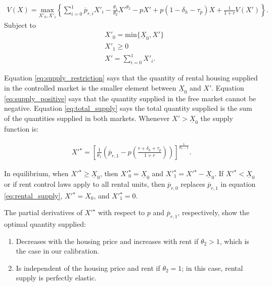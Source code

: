 \documentclass[parskip=full]{article}
\begin{document}
\begin{align}\label{eq:rental_company_problem}
V(X)=\underset{X'_{0},X'_{1}} {\text{$\mbox{max} $}}\left\{\sum_{i=0}^{1} \overline{p}_{r,i}X'_{i}-\frac{\theta_{1}}{\theta_{2}}X'^{\theta_{2}}-p X'+p(1-\delta_{h}-\tau_{p})X+\frac{1}{1+r}V(X')\right\}.
\end{align}
Subject to
\begin{align}
& X'_{0}=\mbox{min}\{\underline{X}_{0},X'\} \label{eq:supply_restriction} \\
& X'_{1} \geq 0 \label{eq:supply_positive} \\
& X'=\sum^{1}_{i=0} X'_{i}. \label{eq:total_supply} 
\end{align}

\noindent Equation \ref{eq:supply_restriction} says that the quantity of rental housing supplied in the controlled market is the smaller element between $\underline{X}_{0}$ and $X'$. Equation \ref{eq:supply_positive} says that the quantity supplied in the free market cannot be negative. Equation \ref{eq:total_supply} says the total quantity supplied is the sum of the quantities supplied in both markets. Whenever $X'>\underline{X}_{0}$ the supply function is:

\begin{align}\label{eq:rental_supply}
X'^{\star}=\left[\frac{1}{\theta_{1}}\left(\overline{p}_{r,1}-p\left(\frac{r+\delta_{h}+\tau_{p}}{1+r}\right)\right)\right]^{\frac{1}{\theta_{2}-1}}.
\end{align}

\noindent In equilibrium, when $X'^{\star}\geq \underline{X}_{0}$, then $X'^{\star}_{0}=\underline{X}_{0}$ and $X'^{\star}_{1}=X'^{\star}-\underline{X}_{0}$. If $X'^{\star}<\underline{X}_{0}$ or if rent control laws apply to all rental units, then $\overline{p}_{r,0}$ replaces $\overline{p}_{r,1}$ in equation \ref{eq:rental_supply}, $X'^{\star}=X_{0}$, and $X'^{\star}_{1}=0$. 

\noindent The partial derivatives of $X'^{\star}$ with respect to $p$ and $\overline{p}_{r,1}$, respectively, show the optimal quantity supplied:

\begin{enumerate}
    \item Decreases with the housing price and increases with rent if $\theta_{2}>1$, which is the case in our calibration.
    \item Is independent of the housing price and rent if $\theta_{2}=1$; in this case, rental supply is perfectly elastic.
\end{enumerate}
\end{document}
